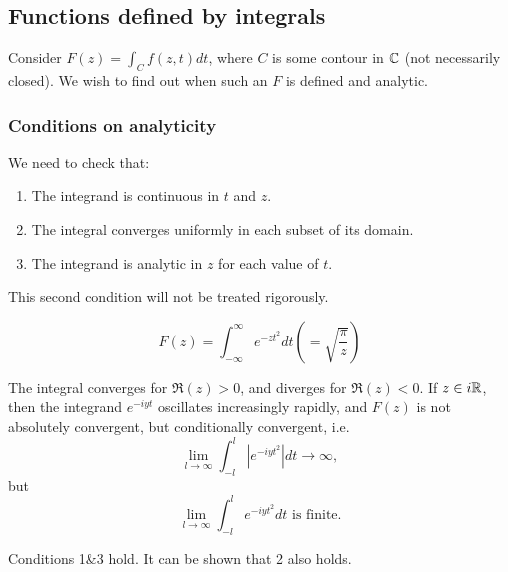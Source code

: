 \documentclass[a4paper]{article}
\begin{document}
\subsection{Functions defined by integrals}

Consider $F(z) = \int_{C} f(z,t) dt$, where $C$ is some contour in $\mathbb{C}$ (not necessarily closed). We wish to find out when such an $F$ is defined and analytic.

\subsubsection*{Conditions on analyticity}

We need to check that:
\begin{enumerate}
	\item The integrand is continuous in $t$ and $z$.
	\item The integral converges uniformly in each subset of its domain.
	\item The integrand is analytic in $z$ for each value of $t$.
\end{enumerate}
This second condition will not be treated rigorously.

\begin{eg}
	\[
		F(z) = \int_{-\infty}^{\infty} e^{-zt^2} dt \left( = \sqrt{\frac{\pi}{z}}  \right) 
	\]

	The integral converges for $\Re(z) > 0$, and diverges for $\Re(z) <0$. If  $z \in i\mathbb{R}$, then the integrand $e^{-iyt}$ oscillates increasingly rapidly, and $F(z)$ is not absolutely convergent, but conditionally convergent, i.e.
	\[
	\lim_{l\to \infty} \int_{-l}^{l} |e^{-iyt^2}|dt \to  \infty
	,\] but
	\[
		\lim_{l\to \infty} \int_{-l}^{l} e^{-iyt^2} dt \text{ is finite.}
	\] 

	Conditions 1&3 hold. It can be shown that 2 also holds. 
\end{eg}
\end{document}
